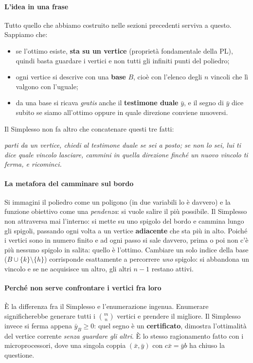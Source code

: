 \documentclass[12pt]{extarticle} %
\begin{document}
\paragraph{L'idea in una frase}
Tutto quello che abbiamo costruito nelle sezioni precedenti serviva a questo. Sappiamo che:
\begin{itemize}
    \item se l'ottimo esiste, \textbf{sta su un vertice} (proprietà fondamentale della PL), quindi basta guardare i vertici e non tutti gli infiniti punti del poliedro;
    \item ogni vertice si descrive con una \textbf{base} $B$, cioè con l'elenco degli $n$ vincoli che lì valgono con l'uguale;
    \item da una base si ricava \emph{gratis} anche il \textbf{testimone duale} $\bar{y}$, e il segno di $\bar{y}$ dice subito se siamo all'ottimo oppure in quale direzione conviene muoversi.
\end{itemize}
Il Simplesso non fa altro che concatenare questi tre fatti:
\begin{center}
\emph{parti da un vertice, chiedi al testimone duale se sei a posto; se non lo sei, lui ti dice quale vincolo lasciare, cammini in quella direzione finché un nuovo vincolo ti ferma, e ricominci.}
\end{center}

\paragraph{La metafora del camminare sul bordo}
Si immagini il poliedro come un poligono (in due variabili lo è davvero) e la funzione obiettivo come una \emph{pendenza}: si vuole salire il più possibile. Il Simplesso non attraversa mai l'interno: si mette su uno spigolo del bordo e cammina lungo gli spigoli, passando ogni volta a un vertice \textbf{adiacente} che sta più in alto. Poiché i vertici sono in numero finito e ad ogni passo si sale davvero, prima o poi non c'è più nessuno spigolo in salita: quello è l'ottimo. Cambiare un solo indice della base ($B \cup \{k\} \setminus \{h\}$) corrisponde esattamente a percorrere \emph{uno} spigolo: si abbandona un vincolo e se ne acquisisce un altro, gli altri $n-1$ restano attivi.

\paragraph{Perché non serve confrontare i vertici fra loro}
È la differenza fra il Simplesso e l'enumerazione ingenua. Enumerare significherebbe generare tutti i $\binom{m}{n}$ vertici e prendere il migliore. Il Simplesso invece si ferma appena $\bar{y}_B \ge 0$: quel segno è un \textbf{certificato}, dimostra l'ottimalità del vertice corrente \emph{senza guardare gli altri}. È lo stesso ragionamento fatto con i microprocessori, dove una singola coppia $(\bar{x},\bar{y})$ con $c\bar{x} = \bar{y}b$ ha chiuso la questione.
\end{document}
